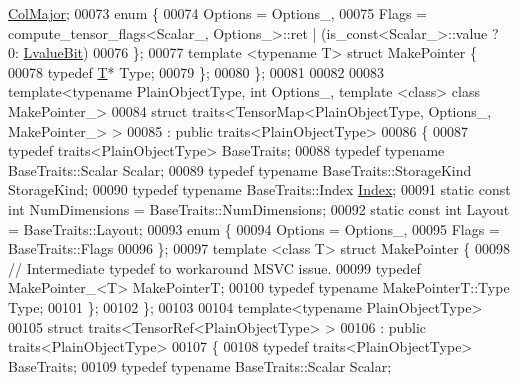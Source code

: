 \begin{DoxyCode}
      \hyperlink{group__enums_ggaacded1a18ae58b0f554751f6cdf9eb13a0cbd4bdd0abcfc0224c5fcb5e4f6669a}{ColMajor};
00073   \textcolor{keyword}{enum} \{
00074     Options = Options\_,
00075     Flags = compute\_tensor\_flags<Scalar\_, Options\_>::ret | (is\_const<Scalar\_>::value ? 0: 
      \hyperlink{group__flags_gae2c323957f20dfdc6cb8f44428eaec1a}{LvalueBit})
00076   \};
00077   \textcolor{keyword}{template} <\textcolor{keyword}{typename} T> \textcolor{keyword}{struct }MakePointer \{
00078     \textcolor{keyword}{typedef} \hyperlink{group___sparse_core___module_class_eigen_1_1_triplet}{T}* Type;
00079   \};
00080 \};
00081 
00082 
00083 \textcolor{keyword}{template}<\textcolor{keyword}{typename} PlainObjectType, \textcolor{keywordtype}{int} Options\_, \textcolor{keyword}{template} <\textcolor{keyword}{class}> \textcolor{keyword}{class }MakePointer\_>
00084 \textcolor{keyword}{struct }traits<TensorMap<PlainObjectType, Options\_, MakePointer\_> >
00085   : \textcolor{keyword}{public} traits<PlainObjectType>
00086 \{
00087   \textcolor{keyword}{typedef} traits<PlainObjectType> BaseTraits;
00088   \textcolor{keyword}{typedef} \textcolor{keyword}{typename} BaseTraits::Scalar Scalar;
00089   \textcolor{keyword}{typedef} \textcolor{keyword}{typename} BaseTraits::StorageKind StorageKind;
00090   \textcolor{keyword}{typedef} \textcolor{keyword}{typename} BaseTraits::Index \hyperlink{namespace_eigen_a62e77e0933482dafde8fe197d9a2cfde}{Index};
00091   \textcolor{keyword}{static} \textcolor{keyword}{const} \textcolor{keywordtype}{int} NumDimensions = BaseTraits::NumDimensions;
00092   \textcolor{keyword}{static} \textcolor{keyword}{const} \textcolor{keywordtype}{int} Layout = BaseTraits::Layout;
00093   \textcolor{keyword}{enum} \{
00094     Options = Options\_,
00095     Flags = BaseTraits::Flags
00096   \};
00097   \textcolor{keyword}{template} <\textcolor{keyword}{class} T> \textcolor{keyword}{struct }MakePointer \{
00098     \textcolor{comment}{// Intermediate typedef to workaround MSVC issue.}
00099     \textcolor{keyword}{typedef} MakePointer\_<T> MakePointerT;
00100     \textcolor{keyword}{typedef} \textcolor{keyword}{typename} MakePointerT::Type Type;
00101   \};
00102 \};
00103 
00104 \textcolor{keyword}{template}<\textcolor{keyword}{typename} PlainObjectType>
00105 \textcolor{keyword}{struct }traits<TensorRef<PlainObjectType> >
00106   : \textcolor{keyword}{public} traits<PlainObjectType>
00107 \{
00108   \textcolor{keyword}{typedef} traits<PlainObjectType> BaseTraits;
00109   \textcolor{keyword}{typedef} \textcolor{keyword}{typename} BaseTraits::Scalar Scalar;

\end{DoxyCode}
